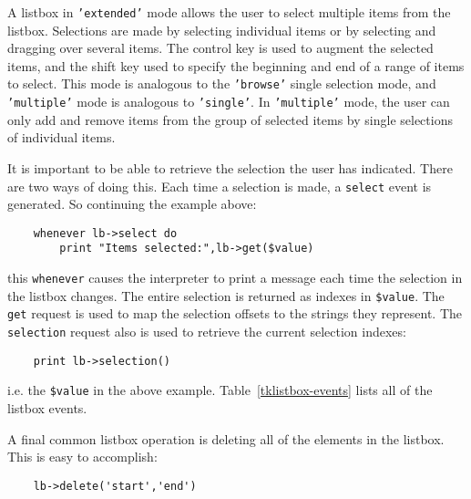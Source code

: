 A listbox in {\tt 'extended'} mode allows the user to select multiple items from the
listbox. Selections are made by selecting individual items or by selecting and
dragging over several items. The control key is used to augment the selected
items, and the shift key used to specify the beginning and end of a range of
items to select. This mode is analogous to the {\tt 'browse'} single selection
mode, and {\tt 'multiple'} mode is analogous to {\tt 'single'}. In {\tt 'multiple'}
mode, the user can only add and remove items from the group of 
selected items by
single selections of individual items.

It is important to be able to retrieve the selection the user has indicated. There
are two ways of doing this. Each time a selection is made, a {\tt select} event
is generated. So continuing the example above:
\begin{verbatim}
    whenever lb->select do
        print "Items selected:",lb->get($value)
\end{verbatim}
this {\tt whenever} causes the interpreter to print a message each time
the selection in the listbox changes. The entire selection is returned
as indexes in \verb+$value+. The {\tt get} request is used to map the
selection offsets to the strings they represent. The {\tt selection}
request also is  used to retrieve the current selection indexes:
\begin{verbatim}
    print lb->selection()
\end{verbatim}
i.e. the \verb+$value+ in the above example. Table~\ref{tklistbox-events}
lists all of the listbox events.

A final common listbox operation is deleting all of the  elements in the
listbox. This is easy to accomplish:
\begin{verbatim}
    lb->delete('start','end')
\end{verbatim}

